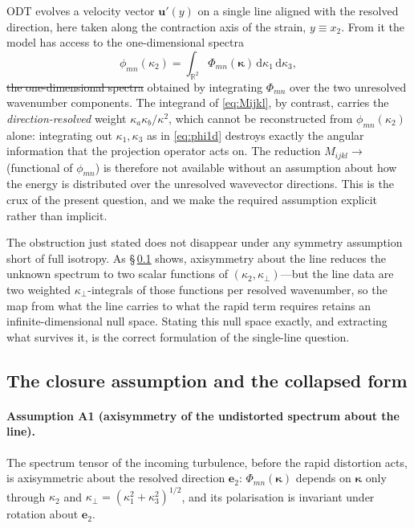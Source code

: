 \documentclass[lineno]{JFM-FLM_Au}
\providecommand{\DIFdel}[1]{{\protect\color{red}\sout{#1}}} %
\providecommand{\DIFdelbegin}{} %
\providecommand{\DIFdelend}{} %
\begin{document}
ODT evolves a velocity vector $\boldsymbol{u}'(y)$ on a single line aligned
with the resolved direction, here taken along the contraction axis of the
strain, $y\equiv x_2$. From it the model has access to the one-dimensional
spectra
\begin{equation}
  \phi_{mn}(\kappa_2)
  = \int_{\mathbb{R}^2}
      \Phi_{mn}(\boldsymbol{\kappa})\,
      \mathrm{d}\kappa_1\,\mathrm{d}\kappa_3,
  \label{eq:phi1d}
\end{equation}
\DIFdelbegin \DIFdel{the one-dimensional spectra }\DIFdelend obtained by integrating $\Phi_{mn}$ over the two
unresolved wavenumber components. The integrand of \eqref{eq:Mijkl}, by
contrast, carries the \emph{direction-resolved} weight
$\kappa_a\kappa_b/\kappa^2$, which cannot be reconstructed from
$\phi_{mn}(\kappa_2)$ alone: integrating out $\kappa_1,\kappa_3$ as in
\eqref{eq:phi1d} destroys exactly the angular information that the projection
operator acts on. The reduction $M_{ijkl}\!\to\!$ (functional of
$\phi_{mn}$) is therefore not available without an assumption about how the
energy is distributed over the unresolved wavevector directions. This is the
crux of the present question, and we make the required assumption explicit
rather than implicit.

The obstruction just stated does not disappear under any symmetry
assumption short of full isotropy. As \S\,\ref{sec:assumption} shows,
axisymmetry about the line reduces the unknown spectrum to two scalar
functions of $(\kappa_2,\kappa_\perp)$---but the line data are two weighted
$\kappa_\perp$-integrals of those functions per resolved wavenumber, so the
map from what the line carries to what the rapid term requires retains an
infinite-dimensional null space. Stating this null space exactly, and
extracting what survives it, is the correct formulation of the single-line
question.

\subsection{The closure assumption and the collapsed form}
\label{sec:assumption}

\paragraph{Assumption A1 (axisymmetry of the undistorted spectrum about the
line).} The spectrum tensor of the incoming turbulence, before the rapid
distortion acts, is axisymmetric about the resolved direction $\boldsymbol{e}_2$:
$\Phi_{mn}(\boldsymbol{\kappa})$ depends on $\boldsymbol{\kappa}$ only through
$\kappa_2$ and $\kappa_\perp=(\kappa_1^2+\kappa_3^2)^{1/2}$, and its
polarisation is invariant under rotation about $\boldsymbol{e}_2$.
\end{document}
